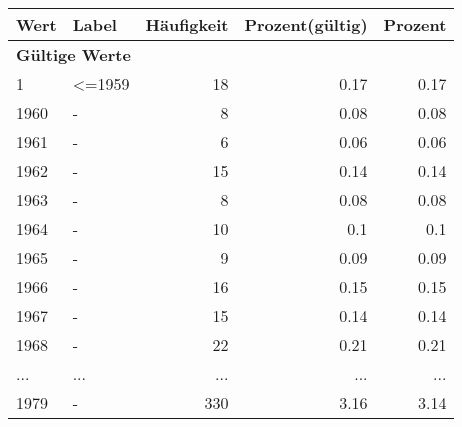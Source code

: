      \begin{longtable}{lXrrr}
     \toprule
     \textbf{Wert} & \textbf{Label} & \textbf{Häufigkeit} & \textbf{Prozent(gültig)} & \textbf{Prozent} \\
     \endhead
     \midrule
     \multicolumn{5}{l}{\textbf{Gültige Werte}}\\
        1 & \multicolumn{1}{X}{\textless{}=1959} & %
          \num{18} &
          \num[round-mode=places,round-precision=2]{0,17} &
          \num[round-mode=places,round-precision=2]{0,17} \\
        1960 & \multicolumn{1}{X}{-} & %
          \num{8} &
          \num[round-mode=places,round-precision=2]{0,08} &
          \num[round-mode=places,round-precision=2]{0,08} \\
        1961 & \multicolumn{1}{X}{-} & %
          \num{6} &
          \num[round-mode=places,round-precision=2]{0,06} &
          \num[round-mode=places,round-precision=2]{0,06} \\
        1962 & \multicolumn{1}{X}{-} & %
          \num{15} &
          \num[round-mode=places,round-precision=2]{0,14} &
          \num[round-mode=places,round-precision=2]{0,14} \\
        1963 & \multicolumn{1}{X}{-} & %
          \num{8} &
          \num[round-mode=places,round-precision=2]{0,08} &
          \num[round-mode=places,round-precision=2]{0,08} \\
        1964 & \multicolumn{1}{X}{-} & %
          \num{10} &
          \num[round-mode=places,round-precision=2]{0,1} &
          \num[round-mode=places,round-precision=2]{0,1} \\
        1965 & \multicolumn{1}{X}{-} & %
          \num{9} &
          \num[round-mode=places,round-precision=2]{0,09} &
          \num[round-mode=places,round-precision=2]{0,09} \\
        1966 & \multicolumn{1}{X}{-} & %
          \num{16} &
          \num[round-mode=places,round-precision=2]{0,15} &
          \num[round-mode=places,round-precision=2]{0,15} \\
        1967 & \multicolumn{1}{X}{-} & %
          \num{15} &
          \num[round-mode=places,round-precision=2]{0,14} &
          \num[round-mode=places,round-precision=2]{0,14} \\
        1968 & \multicolumn{1}{X}{-} & %
          \num{22} &
          \num[round-mode=places,round-precision=2]{0,21} &
          \num[round-mode=places,round-precision=2]{0,21} \\
       ... & ... & ... & ... & ... \\
        1979 & \multicolumn{1}{X}{-} & %
          \num{330} &
          \num[round-mode=places,round-precision=2]{3,16} &
          \num[round-mode=places,round-precision=2]{3,14} \\


\end{longtable}
